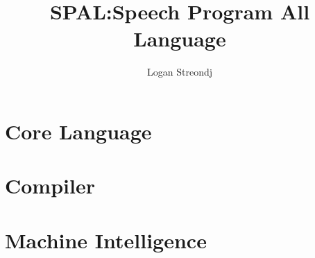 \documentclass{report}
\title{SPAL:\@ Speech Program All Language}
\author{Logan Streondj}
\begin{document}
\maketitle{}
\tableofcontents{}
\listoffigures{}
\listoftables{}

\part{Core Language}

\part{Compiler}



\part{Machine Intelligence}

%

\printbibliography{}
\end{document}

